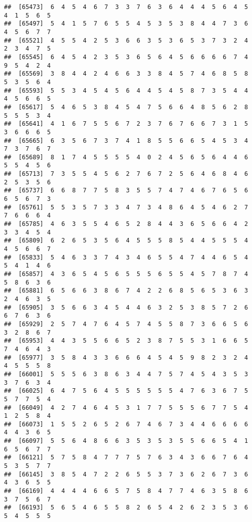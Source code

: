 \documentclass[
]{book}
\begin{document}
\begin{verbatim}
##  [65473]  6  4  5  4  6  7  3  3  7  6  3  6  4  4  4  5  6  4  5  4  1  5  6  5
##  [65497]  5  4  1  5  7  6  5  5  4  5  3  5  3  8  4  4  7  3  6  4  5  6  7  7
##  [65521]  4  5  5  4  2  5  3  6  6  3  5  3  6  5  3  7  3  2  4  2  3  4  7  5
##  [65545]  6  4  5  4  2  3  5  3  6  5  6  4  5  6  6  6  6  7  4  9  5  4  2  4
##  [65569]  3  8  4  4  2  4  6  6  3  3  8  4  5  7  4  6  8  5  8  5  3  5  6  4
##  [65593]  5  5  3  4  5  4  5  6  4  4  5  4  5  8  7  3  5  4  4  4  5  6  6  5
##  [65617]  5  4  6  5  3  8  4  5  4  7  5  6  6  4  8  5  6  2  8  5  5  5  3  4
##  [65641]  4  1  6  7  5  5  6  7  2  3  7  6  7  6  6  7  3  1  5  3  6  6  6  5
##  [65665]  6  3  5  6  7  3  7  4  1  8  5  5  6  6  5  4  5  3  4  7  3  7  6  7
##  [65689]  8  1  7  4  5  5  5  5  4  0  2  4  5  6  5  6  4  4  6  5  5  4  5  6
##  [65713]  7  3  5  5  4  5  6  2  7  6  7  2  5  6  4  6  8  4  6  2  5  3  5  6
##  [65737]  6  6  8  7  7  5  8  3  5  5  7  4  7  4  6  7  6  5  6  6  5  6  7  3
##  [65761]  5  5  3  5  7  3  3  4  7  3  4  8  6  4  5  4  6  2  7  7  6  6  6  4
##  [65785]  4  6  3  5  5  4  6  5  2  8  4  4  3  6  5  6  6  4  2  3  3  4  5  4
##  [65809]  6  2  6  5  3  5  6  4  5  5  5  8  5  4  4  5  5  5  4  4  5  6  6  7
##  [65833]  5  4  6  3  3  7  4  3  4  6  5  5  4  7  4  4  6  5  4  5  4  1  4  6
##  [65857]  4  3  6  5  4  5  6  5  5  5  6  5  5  4  5  7  8  7  4  5  8  6  3  6
##  [65881]  6  5  6  6  3  8  6  7  4  2  2  6  8  5  6  5  3  6  3  2  4  6  3  5
##  [65905]  3  5  6  6  3  4  5  4  4  6  3  2  5  3  8  5  7  2  6  6  7  6  3  6
##  [65929]  2  5  7  4  7  6  4  5  7  4  5  5  8  7  3  6  6  5  6  3  2  8  6  7
##  [65953]  4  4  3  5  5  6  6  5  2  3  8  7  5  5  3  1  6  6  5  7  4  6  4  3
##  [65977]  3  5  8  4  3  3  6  6  6  4  5  4  5  9  8  2  3  2  4  4  5  5  5  8
##  [66001]  5  5  5  6  3  8  6  3  4  4  7  5  7  4  5  4  3  5  3  3  7  6  3  4
##  [66025]  6  4  7  5  6  4  5  5  5  5  5  5  4  7  6  3  6  7  5  5  7  7  5  4
##  [66049]  4  2  7  4  6  4  5  3  1  7  7  5  5  5  6  7  7  5  4  1  2  5  8  4
##  [66073]  1  5  5  2  6  5  2  6  7  4  6  7  3  4  4  6  6  6  6  4  4  3  6  5
##  [66097]  5  5  6  4  8  6  6  3  5  3  5  3  5  5  6  6  5  4  1  6  5  6  7  7
##  [66121]  5  7  5  8  4  7  7  7  5  7  6  3  4  3  6  6  7  6  4  5  3  5  7  7
##  [66145]  3  8  5  4  7  2  2  6  5  5  3  7  3  6  2  6  7  3  6  4  3  6  5  5
##  [66169]  4  4  4  4  6  6  5  7  5  8  4  7  7  4  6  3  5  8  6  3  7  5  6  7
##  [66193]  5  6  5  4  6  5  5  8  2  6  5  4  2  6  2  3  5  3  6  5  4  5  5  5

\end{verbatim}
\end{document}
